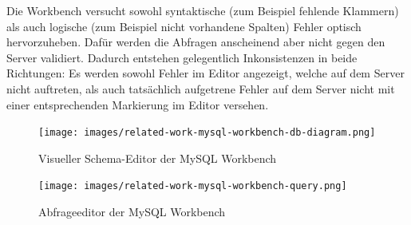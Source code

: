 Die Workbench versucht sowohl syntaktische (zum Beispiel fehlende Klammern) als auch logische (zum Beispiel nicht vorhandene Spalten) Fehler optisch hervorzuheben. Dafür werden die Abfragen anscheinend aber nicht gegen den Server validiert. Dadurch entstehen gelegentlich Inkonsistenzen in beide Richtungen: Es werden sowohl Fehler im Editor angezeigt, welche auf dem Server nicht auftreten, als auch tatsächlich aufgetrene Fehler auf dem Server nicht mit einer entsprechenden Markierung im Editor versehen.

\begin{figure}[p]
  \centering \texttt{[image: images/related-work-mysql-workbench-db-diagram.png]}
  \caption{Visueller Schema-Editor der MySQL Workbench}
  \label{fig:mysql-workbench-schema-diagram}
\end{figure}

\begin{figure}[p]
  \centering \texttt{[image: images/related-work-mysql-workbench-query.png]}
  \caption{Abfrageeditor der MySQL Workbench}
  \label{fig:mysql-workbench-query}
\end{figure}

